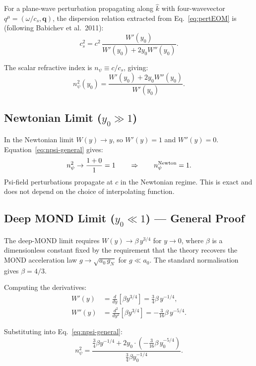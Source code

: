 \documentclass[aps,prd,twocolumn,superscriptaddress]{revtex4-2}
\newcommand{\npsi}{n_\psi}
\begin{document}
For a plane-wave perturbation propagating along $\hat{k}$ with
four-wavevector $q^\mu = (\omega/c_s, \mathbf{q})$, the dispersion
relation extracted from Eq.~\eqref{eq:pertEOM} is (following
Babichev et al.\ 2011):
\begin{equation}
c_s^2 = c^2\,\frac{W'(y_0)}{W'(y_0) + 2y_0 W''(y_0)}.
\label{eq:cs-general}
\end{equation}

The scalar refractive index is $\npsi \equiv c/c_s$, giving:
\begin{equation}
\boxed{
\npsi^2(y_0) = \frac{W'(y_0) + 2y_0 W''(y_0)}{W'(y_0)}.
}
\label{eq:npsi-general}
\end{equation}

\subsection{Newtonian Limit ($y_0 \gg 1$)}

In the Newtonian limit $W(y) \to y$, so $W'(y) = 1$ and $W''(y) = 0$.
Equation~\eqref{eq:npsi-general} gives:
\begin{equation}
\npsi^2 \to \frac{1 + 0}{1} = 1 \qquad\Rightarrow\qquad \npsi^{\rm Newton} = 1.
\label{eq:npsi-newton}
\end{equation}
Psi-field perturbations propagate at $c$ in the Newtonian regime.
This is exact and does not depend on the choice of interpolating function.

\subsection{Deep MOND Limit ($y_0 \ll 1$) — General Proof}
\label{subsec:deep-mond}

The deep-MOND limit requires $W(y) \to \beta\, y^{3/4}$ for $y \to 0$,
where $\beta$ is a dimensionless constant fixed by the requirement that
the theory recovers the MOND acceleration law
$g \to \sqrt{a_0\,g_N}$ for $g \ll a_0$.  The standard normalisation
gives $\beta = 4/3$.

Computing the derivatives:
\begin{align}
W'(y) &= \frac{d}{dy}[\beta y^{3/4}] = \tfrac{3}{4}\beta\,y^{-1/4},
\label{eq:Wprime}\\
W''(y) &= \frac{d^2}{dy^2}[\beta y^{3/4}] = -\tfrac{3}{16}\beta\,y^{-5/4}.
\label{eq:Wdprime}
\end{align}

Substituting into Eq.~\eqref{eq:npsi-general}:
\begin{equation}
\npsi^2 = \frac{\tfrac{3}{4}\beta y^{-1/4} + 2y_0 \cdot(-\tfrac{3}{16}\beta\,y_0^{-5/4})}
                {\tfrac{3}{4}\beta y_0^{-1/4}}.
\label{eq:npsi-mond-sub}
\end{equation}
\end{document}
